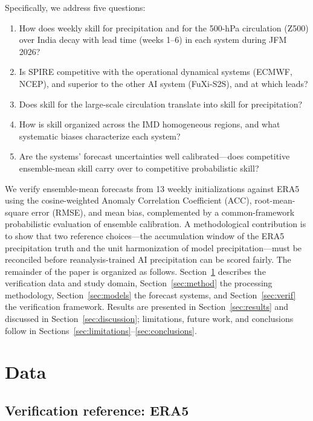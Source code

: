 \documentclass[11pt,a4paper]{article}
\begin{document}
Specifically, we address five questions:
\begin{enumerate}
  \item How does weekly skill for precipitation and for the 500-hPa
        circulation (Z500) over India decay with lead time (weeks 1--6)
        in each system during JFM 2026?
  \item Is SPIRE competitive with the operational dynamical systems
        (ECMWF, NCEP), and superior to the other AI system (FuXi-S2S),
        and at which leads?
  \item Does skill for the large-scale circulation translate into skill
        for precipitation?
  \item How is skill organized across the IMD homogeneous regions, and
        what systematic biases characterize each system?
  \item Are the systems' forecast uncertainties well calibrated---does
        competitive ensemble-mean skill carry over to competitive
        probabilistic skill?
\end{enumerate}
We verify ensemble-mean forecasts from 13 weekly initializations against
ERA5 using the cosine-weighted Anomaly Correlation Coefficient (ACC),
root-mean-square error (RMSE), and mean bias, complemented by a
common-framework probabilistic evaluation of ensemble calibration. A
methodological contribution is to show that two reference choices---the
accumulation window of the ERA5 precipitation truth and the unit
harmonization of model precipitation---must be reconciled before
reanalysis-trained AI precipitation can be scored fairly. The remainder
of the paper is organized as follows. Section~\ref{sec:data} describes the
verification data and study domain, Section~\ref{sec:method} the
processing methodology, Section~\ref{sec:models} the forecast systems,
and Section~\ref{sec:verif} the verification framework. Results are
presented in Section~\ref{sec:results} and discussed in
Section~\ref{sec:discussion}; limitations, future work, and conclusions
follow in Sections~\ref{sec:limitations}--\ref{sec:conclusions}.

\section{Data}\label{sec:data}

\subsection{Verification reference: ERA5}\label{sec:era5}
\end{document}
